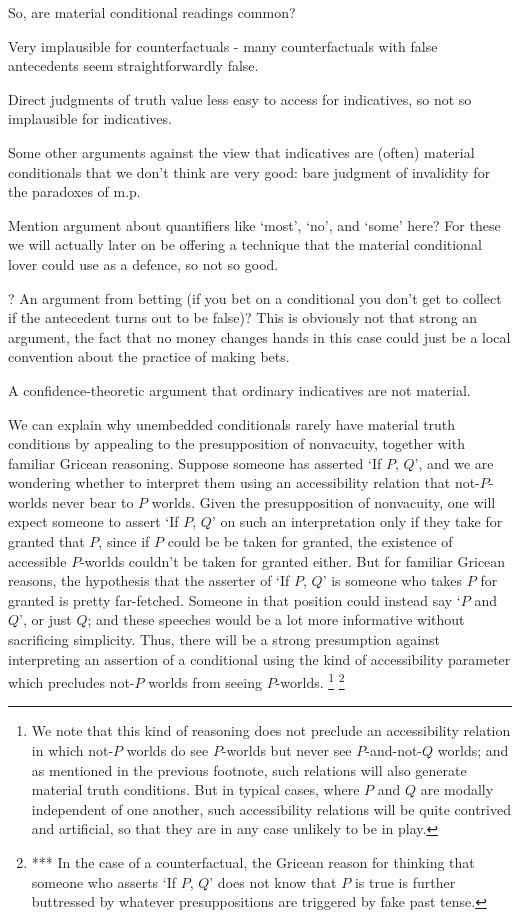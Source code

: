 \documentclass[If.tex]{subfiles}
\begin{document}
So, are material conditional readings common?  
\begin{prop}
	\item
	Very implausible for counterfactuals - many counterfactuals with false antecedents seem straightforwardly false.  
	\item
	Direct judgments of truth value less easy to access for indicatives, so not so implausible for indicatives.  
	\item
	Some other arguments against the view that indicatives are (often) material conditionals that we don't think are very good: bare judgment of invalidity for the paradoxes of m.p.  
	\item
	Mention argument about quantifiers like ‘most’, ‘no’, and ‘some’ here?  For these we will actually later on be offering a technique that the material conditional lover could use as a defence, so not so good.  
	\item
	? An argument from betting (if you bet on a conditional you don't get to collect if the antecedent turns out to be false)?  This is obviously not that strong an argument, the fact that no money changes hands in this case could just be a local convention about the practice of making bets.  
	\item
	A confidence-theoretic argument that ordinary indicatives are not material.  
\end{prop}

We can explain why unembedded conditionals rarely have material truth conditions by appealing to the presupposition of nonvacuity, together with familiar Gricean reasoning.  Suppose someone has asserted ‘If $P$, $Q$’, and we are wondering whether to interpret them using an accessibility relation that not-$P$-worlds never bear to $P$ worlds.  Given the presupposition of nonvacuity, one will expect someone to assert ‘If $P$, $Q$’ on such an interpretation only if they take for granted that $P$, since if $P$ could be be taken for granted, the existence of accessible $P$-worlds couldn't be taken for granted either.  But for familiar Gricean reasons, the hypothesis that the asserter of ‘If $P$, $Q$’ is someone who takes $P$ for granted is pretty far-fetched.  Someone in that position could instead say ‘$P$ and $Q$’, or just $Q$; and these speeches would be a lot more informative without sacrificing simplicity.  Thus, there will be a strong presumption against interpreting an assertion of a conditional using the kind of accessibility parameter which precludes not-$P$ worlds from seeing $P$-worlds.%
\footnote{We note that this kind of reasoning does not preclude an accessibility relation in which not-$P$ worlds do see $P$-worlds but never see $P$-and-not-$Q$ worlds; and as mentioned in the previous footnote, such relations will also generate material truth conditions.  But in typical cases, where $P$ and $Q$ are modally independent of one another, such accessibility relations will be quite contrived and artificial, so that they are in any case unlikely to be in play.}  %
\footnote{*** In the case of a counterfactual, the Gricean reason for thinking that someone who asserts ‘If $P$, $Q$’ does not know that $P$ is true is further buttressed by whatever presuppositions are triggered by fake past tense.}
\end{document}
